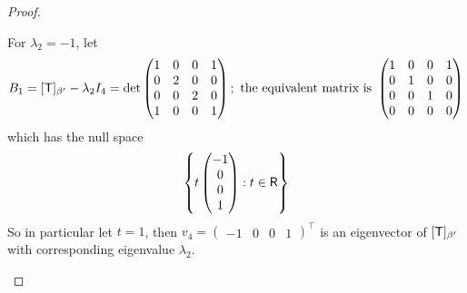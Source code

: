 \begin{proof}
\begin{enumerate}
For \(\lambda_2 = -1\), let
\[
    B_1 = [\textsf{T}]_{\beta'} - \lambda_2 I_4
    = \det \begin{pmatrix}
        1 & 0 & 0 & 1 \\
        0 & 2 & 0 & 0 \\
        0 & 0 & 2 & 0 \\
        1 & 0 & 0 & 1
    \end{pmatrix}; \text{ the equivalent matrix is }
    \begin{pmatrix}
        1 & 0 & 0 & 1 \\
        0 & 1 & 0 & 0 \\
        0 & 0 & 1 & 0 \\
        0 & 0 & 0 & 0
    \end{pmatrix}
\]
which has the null space
\[
    \left\{ t \begin{pmatrix} -1 \\ 0 \\ 0 \\ 1 \end{pmatrix} : t \in \textsf{R} \right\}
\]
So in particular let \(t = 1\), then \(v_4 = \begin{pmatrix} -1 & 0 & 0 & 1 \end{pmatrix}^\top\) is an eigenvector of \([\textsf{T}]_{\beta'}\) with corresponding eigenvalue \(\lambda_2\).


\end{enumerate}
\end{proof}
